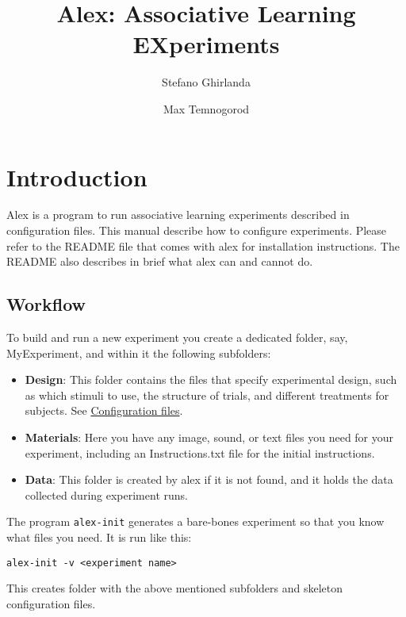 \documentclass[11pt,]{article}
\title{Alex: Associative Learning EXperiments}
\author{Stefano Ghirlanda \and Max Temnogorod}
\date{}
\begin{document}
\maketitle

{
\hypersetup{linkcolor=black}
\setcounter{tocdepth}{3}
\begin{spacing}{0}
\small
\tableofcontents
\end{spacing}
\clearpage
}
\section{Introduction}\label{introduction}

Alex is a program to run associative learning experiments described in
configuration files. This manual describe how to configure experiments.
Please refer to the README file that comes with alex for installation
instructions. The README also describes in brief what alex can and
cannot do.

\subsection{Workflow}\label{workflow}

To build and run a new experiment you create a dedicated folder, say,
MyExperiment, and within it the following subfolders:

\begin{itemize}
\item
  \textbf{Design}: This folder contains the files that specify
  experimental design, such as which stimuli to use, the structure of
  trials, and different treatments for subjects. See
  \hyperref[configuration-files]{Configuration files}.
\item
  \textbf{Materials}: Here you have any image, sound, or text files you
  need for your experiment, including an Instructions.txt file for the
  initial instructions.
\item
  \textbf{Data}: This folder is created by alex if it is not found, and
  it holds the data collected during experiment runs.
\end{itemize}

The program \texttt{alex-init} generates a bare-bones experiment so that
you know what files you need. It is run like this:

\begin{verbatim}
alex-init -v <experiment name>
\end{verbatim}

This creates folder with the above mentioned subfolders and skeleton
configuration files.
\end{document}
